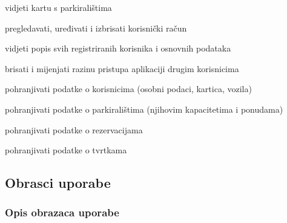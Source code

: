 \begin{packed_enum}
	\begin{packed_enum}
		
		\item vidjeti kartu s parkiralištima
		\item pregledavati, uređivati i izbrisati korisnički račun
		\item vidjeti popis svih registriranih korisnika i osnovnih podataka
		\item brisati i mijenjati razinu pristupa aplikaciji drugim korisnicima
		
	\end{packed_enum}
	
	\item {}
	
	\begin{packed_enum}
		
		\item pohranjivati podatke o korisnicima (osobni podaci, kartica, vozila)
		\item pohranjivati podatke o parkiralištima (njihovim kapacitetima i ponudama)
		\item pohranjivati podatke o rezervacijama
		\item pohranjivati podatke o tvrtkama
		
	\end{packed_enum}
\end{packed_enum}


\eject 



\subsection{Obrasci uporabe}

\subsubsection{Opis obrazaca uporabe}


\newcommand\showuccounter{\stepcounter{uccounter}\theuccounter}


